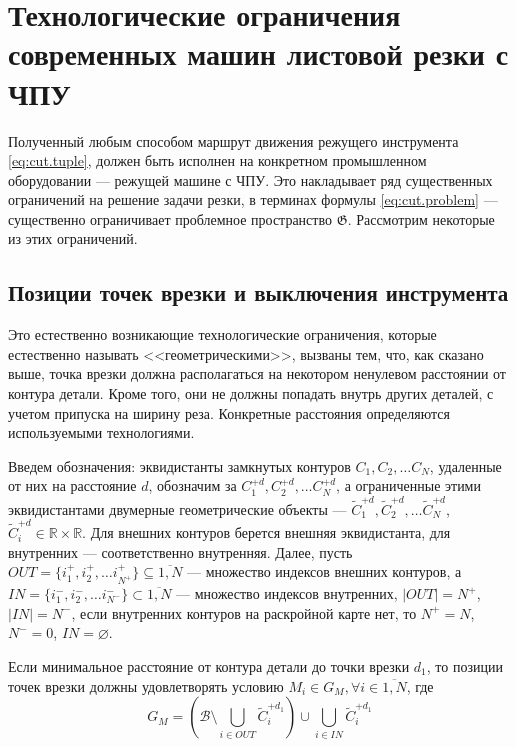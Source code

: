 
\section{Технологические ограничения современных машин листовой резки с ЧПУ}
\label{sec:cut.constr}

Полученный любым способом маршрут движения режущего инструмента~
\eqref{eq:cut.tuple},
должен быть исполнен на конкретном промышленном оборудовании ---
режущей машине с ЧПУ.
Это накладывает ряд существенных ограничений на решение задачи резки,
в терминах формулы \eqref{eq:cut.problem} ---
существенно ограничивает проблемное пространство
$\mathfrak G$.
Рассмотрим некоторые из этих ограничений.

\subsection{Позиции точек врезки и выключения инструмента}
\label{sec:cut.area}

Это естественно возникающие технологические ограничения,
которые естественно называть <<геометрическими>>,
вызваны тем,
что, как сказано выше,
точка врезки должна располагаться на некотором
ненулевом расстоянии от контура детали.
Кроме того, они не должны попадать внутрь других деталей,
с учетом припуска на ширину реза.
Конкретные расстояния определяются используемыми технологиями.

Введем обозначения:
эквидистанты замкнутых контуров
$C_1, C_2, \dots C_N$,
удаленные от них на расстояние $d$,
обозначим за
$C_1^{+d}, C_2^{+d}, \dots C_N^{+d}$,
а ограниченные этими эквидистантами
двумерные геометрические объекты ---
$\widetilde C_1^{+d}, \widetilde C_2^{+d}, \dots \widetilde C_N^{+d}$,
$\widetilde C_i^{+d} \in \mathbb R \times \mathbb R$.
Для внешних контуров берется внешняя эквидистанта,
для внутренних --- соответственно внутренняя.
Далее, пусть
$OUT = \{i_1^+, i_2^+, \dots i_{N^+}^+\} \subseteq \overline{1, N}$ ---
множество индексов внешних контуров,
а
$IN = \{i_1^-, i_2^-, \dots i_{N^-}^-\} \subset \overline{1, N}$ ---
множество индексов внутренних,
$|OUT|=N^+$,
$|IN|=N^-$,
если внутренних контуров на раскройной карте нет,
то $N^+=N$, $N^-=0$, $IN=\varnothing$.

Если минимальное расстояние от контура детали до точки врезки
$d_1$,
то позиции точек врезки должны удовлетворять условию
$M_i \in G_M, \forall i \in \overline{1, N}$,
где
\begin{equation}
  \label{eq:cut.pierce}
  G_M = \left(\mathcal B \setminus \bigcup_{i \in OUT} \widetilde C_i^{+d_1} \right)
  \cup \bigcup_{i \in IN} \widetilde C_i^{+d_1}
\end{equation}

